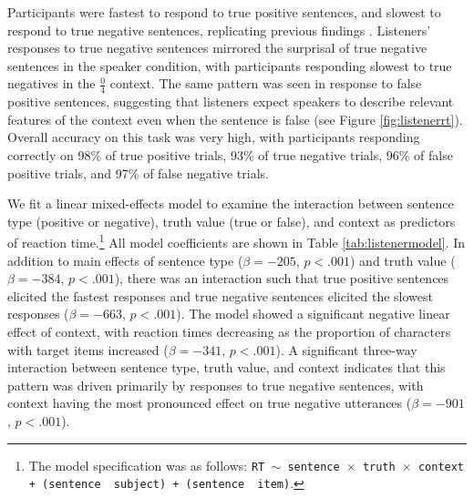 \documentclass[man, floatsintext, noapacite]{apa6}
\begin{document}
Participants were fastest to respond to true positive sentences, and slowest to respond to true negative sentences, replicating previous findings \cite{hclark1972}.  Listeners' responses to true negative sentences mirrored the surprisal of true negative sentences in the speaker condition, with participants responding slowest to true negatives in the $\frac{0}{4}$ context.  The same pattern was seen in response to false positive sentences, suggesting that listeners expect speakers to describe relevant features of the context even when the sentence is false (see Figure \ref{fig:listenerrt}). Overall accuracy on this task was very high, with participants responding correctly on 98\% of true positive trials, 93\% of true negative trials, 96\% of false positive trials, and 97\% of false negative trials.  

We fit a linear mixed-effects model to examine the interaction between sentence type (positive or negative), truth value (true or false), and context as predictors of reaction time.\footnote{The model specification was as follows: \texttt{RT $\sim$ sentence~$\times$~truth~$\times$~context + (sentence~\textbar~subject) +  (sentence~\textbar~item)}.} All model coefficients are shown in Table \ref{tab:listenermodel}. In addition to main effects of sentence type ($\beta= -205$, $p< .001$) and truth value ($\beta= -384$, $p< .001$), there was an interaction such that true positive sentences elicited the fastest responses and true negative sentences elicited the slowest responses ($\beta= -663$, $p< .001$). The model showed a significant negative linear effect of context, with reaction times decreasing as the proportion of characters with target items increased ($\beta= -341$, $p< .001$). A significant three-way interaction between sentence type, truth value, and context indicates that this pattern was driven primarily by responses to true negative sentences, with context having the most pronounced effect on true negative utterances ($\beta= -901$, $p< .001$).  
\end{document}
